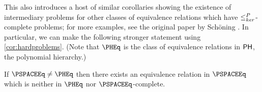 This also introduces a host of similar corollaries showing the existence of intermediary problems for other classes of equivalence relations which have $\leq^{P}_{ker}$-complete problems; for more examples, see the original paper by Sch\"{o}ning \autocite{schoning}.
In particular, we can make the following stronger statement using \autoref{cor:hardproblems}.
(Note that $\PHEq$ is the class of equivalence relations in ${\mathsf{PH}}$, the polynomial hierarchy.)
\begin{corollary}\label{cor:pspace}
  If $\PSPACEEq\neq\PHEq$ then there exists an equivalence relation in $\PSPACEEq$ which is neither in $\PHEq$ nor $\PSPACEEq$-complete.
\end{corollary}

